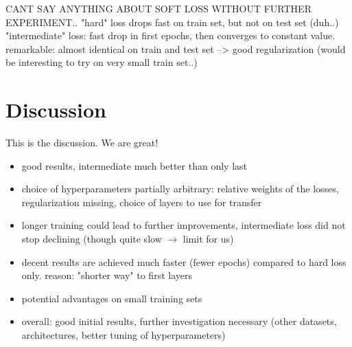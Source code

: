 \documentclass[10pt,twocolumn,letterpaper]{article}
\begin{document}
CANT SAY ANYTHING ABOUT SOFT LOSS WITHOUT FURTHER EXPERIMENT.. 
"hard" loss drops fast on train set, but not on test set (duh..)
"intermediate" loss: fast drop in first epochs, then converges to constant value. remarkable: almost identical on train and test set --> good regularization
(would be interesting to try on very small train set..)


\section{Discussion}
This is the discussion. We are great!

\begin{itemize}
	\item good results, intermediate much better than only last
	\item choice of hyperparameters partially arbitrary: relative weights of the losses, regularization missing, choice of layers to use for transfer
	\item longer training could lead to further improvements, intermediate loss did not stop declining (though quite slow $ \rightarrow $ limit for us)
	\item decent results are achieved much faster (fewer epochs) compared to hard loss only. reason: "shorter way" to first layers
	\item potential advantages on small training sets
	\item overall: good initial results, further investigation necessary (other datasets, architectures, better tuning of hyperparameters)
\end{itemize}

{\small


}
\end{document}
